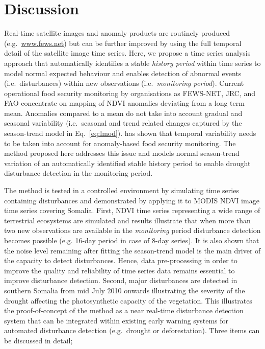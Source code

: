 \documentclass[authoryear,preprint,review,10pt]{elsarticle}
\begin{document}
\section{Discussion} \label{sec:Disc}

Real-time satellite images and anomaly products are routinely produced (e.g.\ \url{www.fews.net}) but can be further improved by using the full temporal detail of the satellite image time series. Here, we propose a time series analysis approach that automatically identifies a stable \emph{history period} within time series to model normal expected behaviour and enables detection of abnormal events (i.e.\ disturbances) within new observations (i.e.\ \emph{monitoring period}). Current operational food security monitoring by organisations as FEWS-NET, JRC, and FAO concentrate on mapping of NDVI anomalies deviating from a long term mean. Anomalies compared to a mean do not take into account gradual and seasonal variability (i.e.\ seasonal and trend related changes captured by the season-trend model in Eq.~\ref{eq:lmod}). \citet{Vrieling:2011da} has shown that temporal variability needs to be taken into account for anomaly-based food security monitoring. The method proposed here addresses this issue and models normal season-trend variation of an automatically identified stable history period to enable drought disturbance detection in the monitoring period.


The method is tested in a controlled environment by simulating time series containing disturbances and demonstrated by applying it to MODIS NDVI image time series covering Somalia. First, NDVI time series representing a wide range of terrestrial ecosystems are simulated and results illustrate that when more than two new observations are available in the \emph{monitoring} period disturbance detection becomes possible (e.g. 16-day period in case of 8-day series). It is also shown that the noise level remaining after fitting the season-trend model is the main driver of the capacity to detect disturbances. Hence, data pre-processing in order to improve the quality and reliability of time series data remains essential to improve disturbance detection.
Second, major disturbances are detected in southern Somalia from mid July 2010 onwards illustrating the severity of the drought affecting the photosynthetic capacity of the vegetation. This illustrates the proof-of-concept of the method as a near real-time disturbance detection system that can be integrated within existing early warning systems for automated disturbance detection (e.g.\ drought or deforestation). Three items can be discussed in detail;
\end{document}
